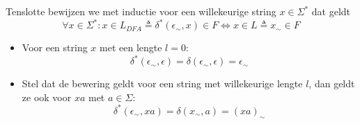 \begin{itemize}
\begin{itemize}
  \end{itemize}
  Tenslotte bewijzen we met inductie voor een willekeurige string $x \in \Sigma^*$ dat geldt
  \begin{equation*}
  \forall x \in \Sigma^*: x \in L_{DFA} \triangleq \delta^*(\epsilon_\sim,x) \in F \Leftrightarrow x \in L \triangleq x_\sim \in F
  \end{equation*}
  \begin{itemize}
  \item Voor een string $x$ met een lengte $l = 0$:
  \begin{equation*}
  \delta^*(\epsilon_\sim,\epsilon) = \delta(\epsilon_\sim,\epsilon) = \epsilon_\sim
  \end{equation*}
  \item Stel dat de bewering geldt voor een string met willekeurige lengte $l$, dan geldt ze ook voor $xa$ met $a \in \Sigma$:
  \begin{equation*}
  \delta^*(\epsilon_\sim,xa) = \delta(x_\sim,a) = (xa)_\sim
  \end{equation*}
  \end{itemize}
  \end{itemize}